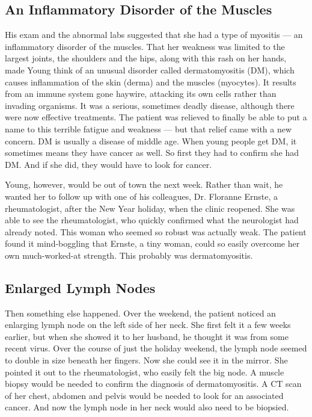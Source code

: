 \hypertarget{an-inflammatory-disorder-of-the-muscles}{%
\subsection{\texorpdfstring{\textbf{An Inflammatory Disorder of the
Muscles}}{An Inflammatory Disorder of the Muscles}}\label{an-inflammatory-disorder-of-the-muscles}}

His exam and the abnormal labs suggested that she had a type of myositis
--- an inflammatory disorder of the muscles. That her weakness was
limited to the largest joints, the shoulders and the hips, along with
this rash on her hands, made Young think of an unusual disorder called
dermatomyositis (DM), which causes inflammation of the skin (derma) and
the muscles (myocytes). It results from an immune system gone haywire,
attacking its own cells rather than invading organisms. It was a
serious, sometimes deadly disease, although there were now effective
treatments. The patient was relieved to finally be able to put a name to
this terrible fatigue and weakness --- but that relief came with a new
concern. DM is usually a disease of middle age. When young people get
DM, it sometimes means they have cancer as well. So first they had to
confirm she had DM. And if she did, they would have to look for cancer.

Young, however, would be out of town the next week. Rather than wait, he
wanted her to follow up with one of his colleagues, Dr. Floranne Ernste,
a rheumatologist, after the New Year holiday, when the clinic reopened.
She was able to see the rheumatologist, who quickly confirmed what the
neurologist had already noted. This woman who seemed so robust was
actually weak. The patient found it mind-boggling that Ernste, a tiny
woman, could so easily overcome her own much-worked-at strength. This
probably was dermatomyositis.

\hypertarget{enlarged-lymph-nodes}{%
\subsection{\texorpdfstring{\textbf{Enlarged Lymph
Nodes}}{Enlarged Lymph Nodes}}\label{enlarged-lymph-nodes}}

Then something else happened. Over the weekend, the patient noticed an
enlarging lymph node on the left side of her neck. She first felt it a
few weeks earlier, but when she showed it to her husband, he thought it
was from some recent virus. Over the course of just the holiday weekend,
the lymph node seemed to double in size beneath her fingers. Now she
could see it in the mirror. She pointed it out to the rheumatologist,
who easily felt the big node. A muscle biopsy would be needed to confirm
the diagnosis of dermatomyositis. A CT scan of her chest, abdomen and
pelvis would be needed to look for an associated cancer. And now the
lymph node in her neck would also need to be biopsied.

